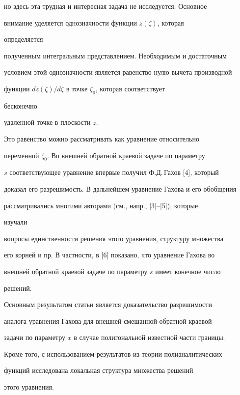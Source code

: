 но здесь эта трудная и интересная задача не исследуется. Основное 


внимание уделяется однозначности функции $z(\zeta)$, которая 


определяется 


полученным интегральным представлением. Необходимым и достаточным 


условием этой однозначности является равенство нулю вычета производной 


функции $dz(\zeta)/d\zeta$ в точке $\zeta_0$, которая соответствует 


бесконечно 


удаленной точке в плоскости $z$. 


 


Это равенство можно рассматривать как уравнение относительно 


переменной $\zeta_0$. Во внешней обратной краевой задаче по параметру 


$s$ соответствующее уравнение впервые получил Ф.Д.\,Гахов [4], который 


доказал его разрешимость. В дальнейшем уравнение Гахова и его обобщения 


рассматривались многими авторами (см., напр., [3]--[5]), которые 


изучали 


вопросы единственности решения этого уравнения, структуру множества 


его корней и пр. В частности, в [6] показано, что уравнение Гахова во 


внешней обратной краевой задаче по параметру $s$ имеет конечное число 


решений. 


 


Основным результатом статьи является доказательство разрешимости 


аналога уравнения Гахова для внешней смешанной обратной краевой 


задачи по параметру $x$ в случае полигональной известной части границы. 


Кроме того, с использованием результатов из теории полианалитических 


функций исследована локальная структура множества решений 


этого уравнения. 


 


 



